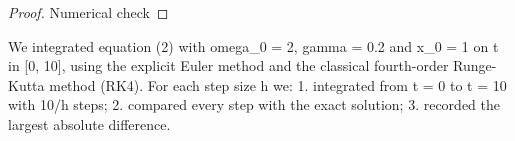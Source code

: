 \documentclass[11pt,a4paper]{article}
\begin{document}
\begin{proof}
  Numerical check
\end{proof}

We integrated equation (2) with omega\_0 = 2, gamma = 0.2 and x\_0 = 1 on t in [0, 10], using the explicit Euler method and the classical fourth-order Runge-Kutta method (RK4). For each step size h we: 1. integrated from t = 0 to t = 10 with 10/h steps; 2. compared every step with the exact solution; 3. recorded the largest absolute difference.

\section{}
\end{document}
